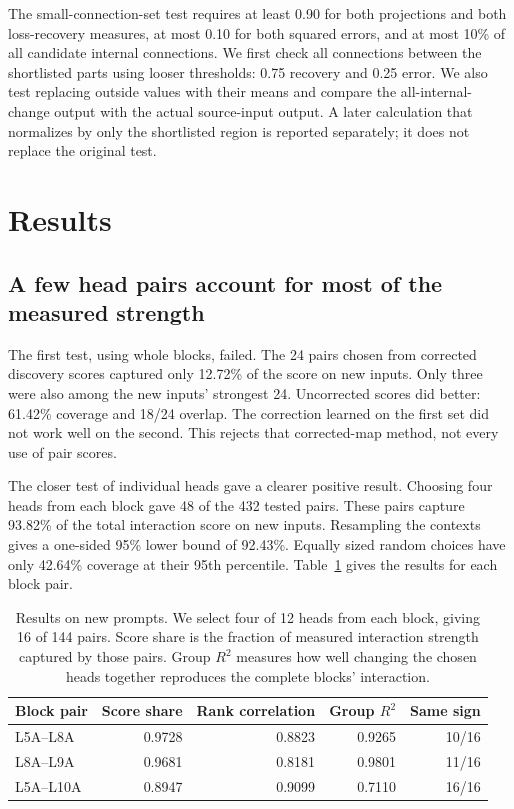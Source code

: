 \documentclass[11pt]{article}
\begin{document}
The small-connection-set test requires at least 0.90 for both projections and
both loss-recovery measures, at most 0.10 for both squared errors, and at most
10\% of all candidate internal connections. We first check all connections
between the shortlisted parts using looser thresholds: 0.75 recovery and 0.25
error. We also test replacing outside values with their means and compare the
all-internal-change output with the actual source-input output. A later
calculation that normalizes by only the shortlisted region is reported
separately; it does not replace the original test.

\section{Results}
\subsection{A few head pairs account for most of the measured strength}
The first test, using whole blocks, failed. The 24 pairs chosen from corrected
discovery scores captured only 12.72\% of the score on new inputs. Only three
were also among the new inputs' strongest 24. Uncorrected scores did better:
61.42\% coverage and 18/24 overlap. The correction learned on the first set
did not work well on the second. This rejects that corrected-map method, not
every use of pair scores.

The closer test of individual heads gave a clearer positive result. Choosing
four heads from each block gave 48 of the 432 tested pairs. These pairs capture
93.82\% of the total interaction score on new inputs. Resampling the contexts
gives a one-sided 95\% lower bound of 92.43\%. Equally sized random choices
have only 42.64\% coverage at their 95th percentile.
Table~\ref{tab:heads} gives the results for each block pair.

\begin{table}[t]
\centering
\caption{Results on new prompts. We select four of 12 heads from each block,
giving 16 of 144 pairs. Score share is the fraction of measured interaction
strength captured by those pairs. Group $R^2$ measures how well changing the
chosen heads together reproduces the complete blocks' interaction.}
\label{tab:heads}
\begin{tabular}{lrrrr}
\toprule
Block pair & Score share & Rank correlation & Group $R^2$ & Same sign\\
\midrule
L5A--L8A  & 0.9728 & 0.8823 & 0.9265 & 10/16\\
L8A--L9A  & 0.9681 & 0.8181 & 0.9801 & 11/16\\
L5A--L10A & 0.8947 & 0.9099 & 0.7110 & 16/16\\
\bottomrule
\end{tabular}
\end{table}
\end{document}
